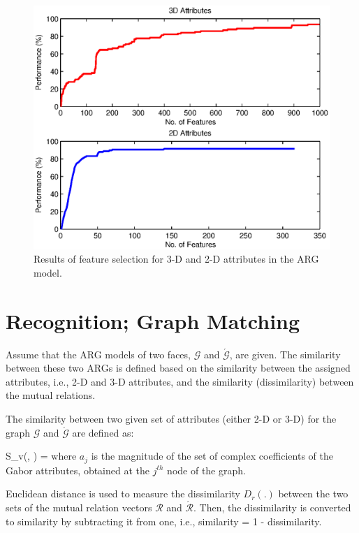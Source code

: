 \begin{figure}
\begin{center}
\includegraphics[width = 5.0 in]{./chapters/figures/feature_selection.eps}
\caption{Results of feature selection for 3-D and 2-D attributes in
the ARG model.}\label{fig_SFFS_features}
\end{center}
\end{figure}

\section{Recognition; Graph Matching} Assume that the ARG models of two faces,
$\mathcal{G}$ and $\acute{\mathcal{G}}$, are given. The similarity
between these two ARGs is defined based on the similarity between
the assigned attributes, i.e., 2-D and 3-D attributes, and the
similarity (dissimilarity) between the mutual relations.

The similarity between two given set of attributes (either 2-D or
3-D) for the graph $\mathcal{G}$ and $\acute{\mathcal{G}}$ are
defined as:

\beq \label{eq_sim_nodes} \displaystyle S_v(,
) =
 \eeq where $a_j$ is the magnitude of
the set of complex coefficients of the Gabor attributes, obtained at
the $j^{th}$ node of the graph.

Euclidean distance is used to measure the dissimilarity $D_r(.)$
between the two sets of the mutual relation vectors $\mathcal{R}$
and $\acute{\mathcal{R}}$. Then, the dissimilarity is converted to
similarity by subtracting it from one, i.e., similarity = 1 -
dissimilarity.


